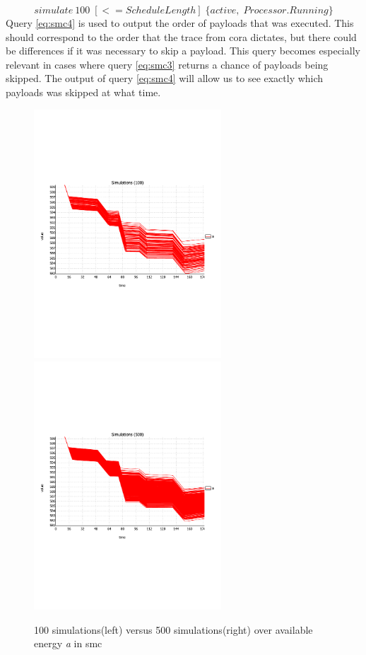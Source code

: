 \begin{equation} \label{eq:smc4}
	simulate\ 100 \; [<=ScheduleLength] \; \{active, \; Processor.Running\}
\end{equation}
Query \ref{eq:smc4} is used to output the order of payloads that was executed. This should correspond to the order that the trace from \gls{cora} dictates, but there could be differences if it was necessary to skip a payload. This query becomes especially relevant in cases where query \ref{eq:smc3} returns a chance of payloads being skipped. The output of query \ref{eq:smc4} will allow us to see exactly which payloads was skipped at what time.

\begin{figure}[H]%
	\centering
	\subfloat
	{{\includegraphics[width=7cm, trim={0 8cm 0 6cm},clip] {graphics/simulation_graphs/SimulationsA100.pdf} }}%
	\qquad
	\subfloat
	{{\includegraphics[width=7cm, trim={0 8cm 0 6cm},clip] {graphics/simulation_graphs/SimulationsA500.pdf} }}%
	\caption{100 simulations(left) versus 500 simulations(right) over available energy \textit{a} in smc}%
	\label{fig:sim_amount}%
\end{figure}
